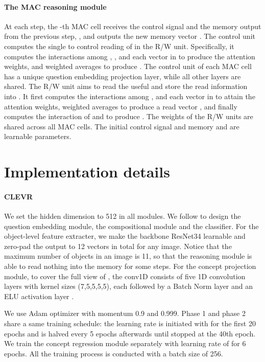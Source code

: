 \documentclass[10pt,twocolumn,letterpaper]{article}
\begin{document}
\paragraph{The MAC reasoning module}



At each step, the -th MAC cell receives the control signal  and the memory output from the previous step, , and outputs the new memory vector .
The control unit computes the single  to control reading of  in the R/W unit. Specifically, it computes the interactions among , , and each vector in  to produce the attention weights, and weighted averages  to produce . The control unit of each MAC cell has a unique question embedding projection layer, while all other layers are shared.
The R/W unit aims to read the useful  and store the read information into . It first computes the interactions among ,  and each vector in  to attain the attention weights, weighted averages  to produce a read vector , and finally computes the interaction of  and  to produce .  The weights of the R/W units are shared across all MAC cells. 
The initial control signal and memory  and  are learnable parameters. 



\section{Implementation details}
\label{app:training_details}

\paragraph{CLEVR}
We set the hidden dimension  to 512 in all modules. We follow \cite{hudson2018compositional} to design the question embedding module, the compositional module and the classifier. For the object-level feature extracter, we make the backbone ResNet34 learnable and zero-pad the output  to 12 vectors in total for any image. Notice that the maximum number of objects in an image is 11, so that the reasoning module is able to read nothing into the memory for some steps. For the concept projection module, to cover the full view of , the conv1D consists of five 1D convolution layers with kernel sizes (7,5,5,5,5),
each followed by a Batch Norm layer \cite{ioffe2015batch} and an ELU activation layer \cite{clevert2015fast}. 

We use Adam optimizer \cite{kingma2014adam} with momentum 0.9 and 0.999. Phase 1 and phase 2 share a same training schedule: the learning rate is initiated with  for the first 20 epochs and is halved every 5 epochs afterwards until stopped at the 40th epoch. We train the concept regression module separately with learning rate of  for 6 epochs. All the training process is conducted with a batch size of 256.
\end{document}
